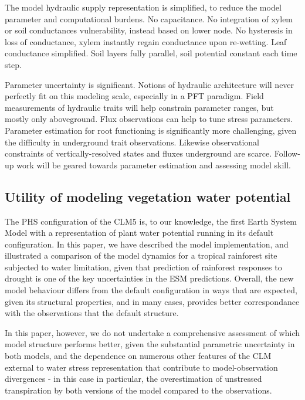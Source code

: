 \documentclass[draft,linenumbers]{agujournal}
\begin{document}
    The model hydraulic supply representation is simplified, to reduce the model parameter and computational burdens.
    No capacitance.
    No integration of xylem or soil conductances vulnerability, instead based on lower node.
    No hysteresis in loss of conductance, xylem instantly regain conductance upon re-wetting.
    Leaf conductance simplified.
    Soil layers fully parallel, soil potential constant each time step.
    
    Parameter uncertainty is significant.
    Notions of hydraulic architecture will never perfectly fit on this modeling scale, especially in a PFT paradigm.
    Field measurements of hydraulic traits will help constrain parameter ranges, but mostly only aboveground.
    Flux observations can help to tune stress parameters.
    Parameter estimation for root functioning is significantly more challenging, given the difficulty in underground trait observations.
    Likewise observational constraints of vertically-resolved states and fluxes underground are scarce.
    Follow-up work will be geared towards parameter estimation and assessing model skill.

\subsection{Utility of modeling vegetation water potential}


    The PHS configuration of the CLM5 is, to our knowledge, the first Earth System Model with a representation of plant water potential running in its default configuration. In this paper, we have described the model implementation, and illustrated a comparison of the model dynamics for a tropical rainforest site subjected to water limitation, given that prediction of rainforest responses to drought is one of the key uncertainties in the ESM predictions. Overall, the new model behaviour differs from the default configuration in ways that are expected, given its structural properties, and in many cases, provides better correspondance with the observations that the default structure. 
    
    In this paper, however, we do not undertake a comprehensive assessment of which model structure performs better, given the substantial parametric uncertainty in both models, and the dependence on numerous other features of the CLM external to water stress representation that contribute to model-observation divergences - in this case in particular, the overestimation of unstressed transpiration by both versions of the model compared to the observations. 
    
\end{document}
